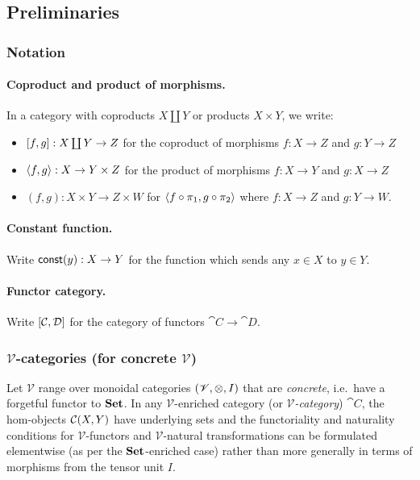 \subsection{Preliminaries}

\subsubsection{Notation}

\paragraph{Coproduct and product of morphisms.} In a category with coproducts $X \coprod Y$ or products $X
\times Y$, we write:
\begin{itemize}
\item $[f, g]: X \coprod Y \to Z$ for the coproduct of morphisms $f: X \to Z$ and $g: Y \to Z$
\item $\langle f, g\rangle: X \to Y \times Z$ for the product of morphisms $f: X \to Y$ and $g: X \to Z$
\item $(f,g): X \times Y \to Z \times W$ for $\langle f \circ \pi_1, g \circ \pi_2\rangle$ where $f: X \to Z$ and $g: Y \to W$.
\end{itemize}

\paragraph{Constant function.} Write $\mathsf{const}(y): X \to Y$ for the function which sends any $x \in X$ to $y \in
Y$.

\paragraph{Functor category.} Write $[\mathcal{C},\mathcal{D}]$ for the category of functors $\cat{C} \to
\cat{D}$.

\subsubsection{$\mathscr{V}$-categories (for concrete $\mathscr{V}$)}

Let $\mathscr{V}$ range over monoidal categories $(\mathscr{V}, \otimes, I)$ that are \emph{concrete},
i.e.~have a forgetful functor to $\mathbf{Set}$. In any $\mathscr{V}$-enriched category (or
\emph{$\mathscr{V}$-category}) $\cat{C}$, the hom-objects ${\mathcal{C}}(X,Y)$ have underlying sets and the
functoriality and naturality conditions for $\mathscr{V}$-functors and $\mathscr{V}$-natural transformations
can be formulated elementwise (as per the $\mathbf{Set}$-enriched case) rather than more generally in terms of
morphisms from the tensor unit $I$. 

